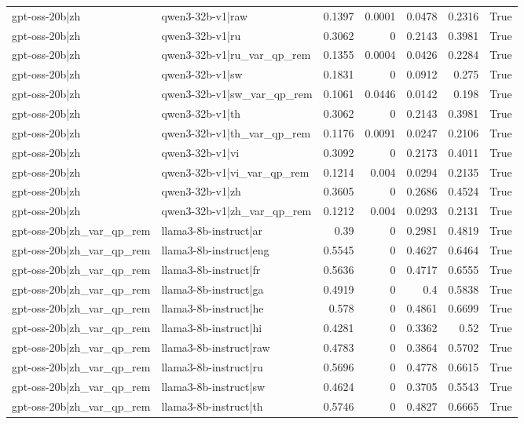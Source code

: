 \begin{table}
\begin{tabular}{l l r r r r l}
gpt-oss-20b|zh & qwen3-32b-v1|raw & 0.1397 & 0.0001 & 0.0478 & 0.2316 & True \\
gpt-oss-20b|zh & qwen3-32b-v1|ru & 0.3062 & 0 & 0.2143 & 0.3981 & True \\
gpt-oss-20b|zh & qwen3-32b-v1|ru_var_qp_rem & 0.1355 & 0.0004 & 0.0426 & 0.2284 & True \\
gpt-oss-20b|zh & qwen3-32b-v1|sw & 0.1831 & 0 & 0.0912 & 0.275 & True \\
gpt-oss-20b|zh & qwen3-32b-v1|sw_var_qp_rem & 0.1061 & 0.0446 & 0.0142 & 0.198 & True \\
gpt-oss-20b|zh & qwen3-32b-v1|th & 0.3062 & 0 & 0.2143 & 0.3981 & True \\
gpt-oss-20b|zh & qwen3-32b-v1|th_var_qp_rem & 0.1176 & 0.0091 & 0.0247 & 0.2106 & True \\
gpt-oss-20b|zh & qwen3-32b-v1|vi & 0.3092 & 0 & 0.2173 & 0.4011 & True \\
gpt-oss-20b|zh & qwen3-32b-v1|vi_var_qp_rem & 0.1214 & 0.004 & 0.0294 & 0.2135 & True \\
gpt-oss-20b|zh & qwen3-32b-v1|zh & 0.3605 & 0 & 0.2686 & 0.4524 & True \\
gpt-oss-20b|zh & qwen3-32b-v1|zh_var_qp_rem & 0.1212 & 0.004 & 0.0293 & 0.2131 & True \\
gpt-oss-20b|zh_var_qp_rem & llama3-8b-instruct|ar & 0.39 & 0 & 0.2981 & 0.4819 & True \\
gpt-oss-20b|zh_var_qp_rem & llama3-8b-instruct|eng & 0.5545 & 0 & 0.4627 & 0.6464 & True \\
gpt-oss-20b|zh_var_qp_rem & llama3-8b-instruct|fr & 0.5636 & 0 & 0.4717 & 0.6555 & True \\
gpt-oss-20b|zh_var_qp_rem & llama3-8b-instruct|ga & 0.4919 & 0 & 0.4 & 0.5838 & True \\
gpt-oss-20b|zh_var_qp_rem & llama3-8b-instruct|he & 0.578 & 0 & 0.4861 & 0.6699 & True \\
gpt-oss-20b|zh_var_qp_rem & llama3-8b-instruct|hi & 0.4281 & 0 & 0.3362 & 0.52 & True \\
gpt-oss-20b|zh_var_qp_rem & llama3-8b-instruct|raw & 0.4783 & 0 & 0.3864 & 0.5702 & True \\
gpt-oss-20b|zh_var_qp_rem & llama3-8b-instruct|ru & 0.5696 & 0 & 0.4778 & 0.6615 & True \\
gpt-oss-20b|zh_var_qp_rem & llama3-8b-instruct|sw & 0.4624 & 0 & 0.3705 & 0.5543 & True \\
gpt-oss-20b|zh_var_qp_rem & llama3-8b-instruct|th & 0.5746 & 0 & 0.4827 & 0.6665 & True \\

\end{tabular}
\end{table}
